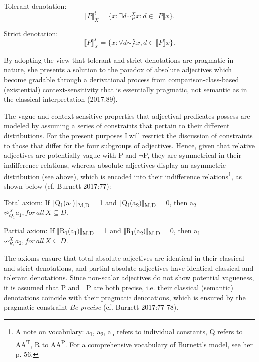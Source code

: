 \documentclass[output=paper
,modfonts
,nonflat]{langsci/langscibook}
\begin{document}
\begin{examples}
	\item Tolerant denotation: \[ \llbracket P \rrbracket_X^t	= \{x : \exists d \sim_P^X  x : d \in \llbracket P\rrbracket x\}\text{.}\]
	\item Strict denotation: \[\llbracket P\rrbracket_X^s  = \{ { x :  \forall d \sim _P^X  x, d  \in   \llbracket P \rrbracket x } \}\text{.}\]
\end{examples}

By adopting the view that tolerant and strict denotations are pragmatic in nature, she presents a solution to the paradox of absolute adjectives which become gradable through a derivational process from comparison-class-based (existential) context-sensitivity that is essentially pragmatic, not semantic as in the classical interpretation (2017:89).

The vague and context-sensitive properties that adjectival predicates possess are modeled by assuming a series of constraints that pertain to their different distributions. For the present purposes I will restrict the discussion of constraints to those that differ for the four subgroups of adjectives. Hence, given that relative adjectives are potentially vague with P and $\neg$P, they are symmetrical in their indifference relations, whereas absolute adjectives display an asymmetric distribution (see above), which is encoded into their indifference relations\footnote{A note on vocabulary: a\textsubscript{1}, a\textsubscript{2}, a\textsubscript{n} refers to individual constants, Q refers to AA\textsuperscript{T}, R to AA\textsuperscript{P}. For a comprehensive vocabulary of Burnett's model, see her p. 56.}, as shown below (cf. Burnett 2017:77):

\begin{examples}
	\item Total axiom: If $\llbracket$Q\textsubscript{1}(a\textsubscript{1})$\rrbracket$\textsubscript{M,D} = 1 and $\llbracket$Q\textsubscript{1}(a\textsubscript{2})$\rrbracket$\textsubscript{M,D} = 0, then a\textsubscript{2} $ \not\sim_{Q_{1}}^X  a_{1}, for \, all \, X \subseteq D.$
	\item Partial axiom: If $\llbracket$R\textsubscript{1}(a\textsubscript{1})$\rrbracket$\textsubscript{M,D} = 1 and $\llbracket$R\textsubscript{1}(a\textsubscript{2})$\rrbracket$\textsubscript{M,D} = 0, then a\textsubscript{1} $ \not\sim_{R_{1}}^X  a_{2}, for \, all \, X \subseteq D.$
\end{examples}

The axioms ensure that total absolute adjectives are identical in their classical and strict denotations, and partial absolute adjectives have identical classical and tolerant denotations. Since non-scalar adjectives do not show potential vagueness, it is assumed that P and $\neg$P are both precise, i.e. their classical (semantic) denotations coincide with their pragmatic denotations, which is ensured by the pragmatic constraint \textit{Be precise} (cf. Burnett 2017:77-78).
\end{document}
